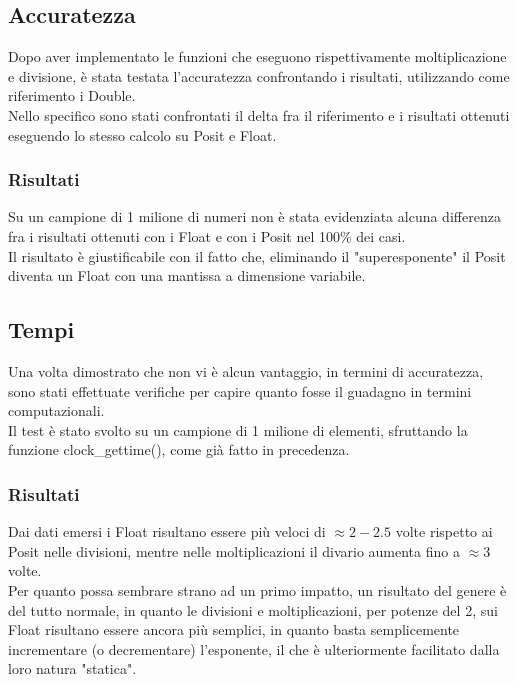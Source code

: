\documentclass[a4paper,11pt]{article}
\begin{document}
\subsection{Accuratezza}

Dopo aver implementato le funzioni che eseguono rispettivamente moltiplicazione e divisione, è stata testata l'accuratezza confrontando i risultati, utilizzando come riferimento i Double. \\
Nello specifico sono stati confrontati il delta fra il riferimento e i risultati ottenuti eseguendo lo stesso calcolo su Posit e Float.

\subsubsection{Risultati} 

Su un campione di 1 milione di numeri non è stata evidenziata alcuna differenza fra i risultati ottenuti con i Float e con i Posit nel 100\% dei casi.\\
Il risultato è giustificabile con il fatto che, eliminando il "superesponente" il Posit diventa un Float con una mantissa a dimensione variabile.

\subsection{Tempi}
Una volta dimostrato che non vi è alcun vantaggio, in termini di accuratezza, sono stati effettuate verifiche per capire quanto fosse il guadagno in termini computazionali.\\
Il test è stato svolto su un campione di 1 milione di elementi, sfruttando la funzione clock\_gettime(), come già fatto in precedenza.
\subsubsection{Risultati}

Dai dati emersi i Float risultano essere più veloci di $\approx 2-2.5$ volte rispetto ai Posit nelle divisioni, mentre nelle moltiplicazioni il divario aumenta fino a $\approx 3$ volte.\\
Per quanto possa sembrare strano ad un primo impatto, un risultato del genere è del tutto normale, in quanto le divisioni e moltiplicazioni, per potenze del 2, sui Float risultano essere ancora più semplici, in quanto basta semplicemente incrementare (o decrementare) l'esponente, il che è ulteriormente facilitato dalla loro natura "statica".
\end{document}
